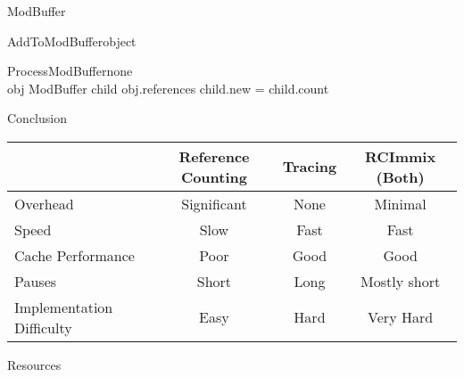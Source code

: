 \documentclass{beamer}
\begin{document}
\addtocounter{section}{1}

\begin{frame}{ModBuffer}
\begin{pseudocode}{AddToModBuffer}{object}
	\\
\end{pseudocode}
\begin{pseudocode}{ProcessModBuffer}{none}
	\\
	\FOREACH obj \in ModBuffer \DO
	\BEGIN
		\FOREACH child \in obj.references \DO
		\BEGIN
			\IF child.new = \TRUE \THEN 
			\BEGIN
				child.count 
			\END
		\END
	\END
\end{pseudocode}
\end{frame}

\renewcommand{\arraystretch}{2}
\begin{frame}{Conclusion}
	\begin{tabular}{p{3cm}|c|c|c}
	 & Reference Counting & Tracing & RCImmix (Both)\\\hline
	Overhead & Significant & None & Minimal\\
	Speed & Slow & Fast & Fast\\
	Cache \mbox{Performance} & Poor & Good & Good\\
	Pauses & Short & Long & Mostly short\\
	Implementation Difficulty & Easy & Hard & Very Hard
	\end{tabular}
\end{frame}

\begin{frame}{Resources}

\nocite{rcimmix}
\nocite{rc}

\end{frame}
\end{document}
